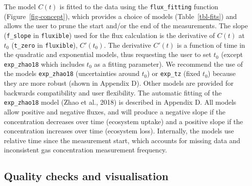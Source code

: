 \documentclass[
  letterpaper,
  DIV=11,
  numbers=noendperiod]{scrartcl}
\begin{document}
The model \(C(t)\) is fitted to the data using the
\texttt{flux\_fitting} function (Figure~\ref{fig-concept}), which
provides a choice of models (Table~\ref{tbl-fits}) and allows the user
to prune the start and/or the end of the measurements. The slope
(\texttt{f\_slope} in \texttt{fluxible}) used for the flux calculation
is the derivative of \(C(t)\) at \(t_0\) (\texttt{t\_zero} in
\texttt{fluxible}), \(C'(t_0)\). The derivative \(C'(t)\) is a function
of time in the quadratic and exponential models, thus requesting the
user to set \(t_0\) (except \texttt{exp\_zhao18} which includes \(t_0\)
as a fitting parameter). We recommend the use of the models
\texttt{exp\_zhao18} (uncertainties around \(t_0\)) or \texttt{exp\_tz}
(fixed \(t_0\)) because they are more robust (shown in Appendix D).
Other models are provided for backwards compatibility and user
flexibility. The automatic fitting of the \texttt{exp\_zhao18} model
(Zhao et al., 2018) is described in Appendix D. All models allow
positive and negative fluxes, and will produce a negative slope if the
concentration decreases over time (ecosystem uptake) and a positive
slope if the concentration increases over time (ecosystem loss).
Internally, the models use relative time since the measurement start,
which accounts for missing data and inconsistent gas concentration
measurement frequency.

\subsection{Quality checks and
visualisation}\label{quality-checks-and-visualisation}
\end{document}
